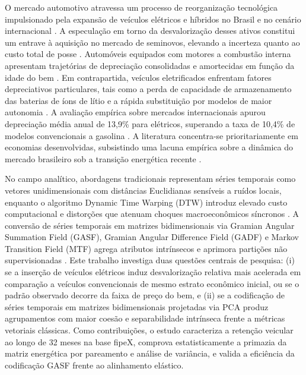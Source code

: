 \documentclass[conference]{IEEEtran}
\begin{document}
O mercado automotivo atravessa um processo de reorganização tecnológica impulsionado pela expansão de veículos elétricos e híbridos no Brasil e no cenário internacional \cite{alvarez2024modelagem}. A especulação em torno da desvalorização desses ativos constitui um entrave à aquisição no mercado de seminovos, elevando a incerteza quanto ao custo total de posse \cite{rush2022vehicle}. Automóveis equipados com motores a combustão interna apresentam trajetórias de depreciação consolidadas e amortecidas em função da idade do bem \cite{storchmann2004depreciation}. Em contrapartida, veículos eletrificados enfrentam fatores depreciativos particulares, tais como a perda de capacidade de armazenamento das baterias de íons de lítio e a rápida substituição por modelos de maior autonomia \cite{gautam2024depreciation}. A avaliação empírica sobre mercados internacionais apurou depreciação média anual de 13,9\% para elétricos, superando a taxa de 10,4\% de modelos convencionais a gasolina \cite{schloter2022empirical}. A literatura concentra-se prioritariamente em economias desenvolvidas, subsistindo uma lacuna empírica sobre a dinâmica do mercado brasileiro sob a transição energética recente \cite{li2026global, silva2024avaliacao}.

No campo analítico, abordagens tradicionais representam séries temporais como vetores unidimensionais com distâncias Euclidianas sensíveis a ruídos locais, enquanto o algoritmo Dynamic Time Warping (DTW) introduz elevado custo computacional e distorções que atenuam choques macroeconômicos síncronos \cite{sakoe1978dynamic}. A conversão de séries temporais em matrizes bidimensionais via Gramian Angular Summation Field (GASF), Gramian Angular Difference Field (GADF) e Markov Transition Field (MTF) agrega atributos intrínsecos e aprimora partições não supervisionadas \cite{wang2015imaging, wu2023imaging}. Este trabalho investiga duas questões centrais de pesquisa: (i) se a inserção de veículos elétricos induz desvalorização relativa mais acelerada em comparação a veículos convencionais de mesmo estrato econômico inicial, ou se o padrão observado decorre da faixa de preço do bem, e (ii) se a codificação de séries temporais em matrizes bidimensionais projetadas via PCA produz agrupamentos com maior coesão e separabilidade intrínseca frente a métricas vetoriais clássicas. Como contribuições, o estudo caracteriza a retenção veicular ao longo de 32 meses na base fipeX, comprova estatisticamente a primazia da matriz energética por pareamento e análise de variância, e valida a eficiência da codificação GASF frente ao alinhamento elástico.
\end{document}
